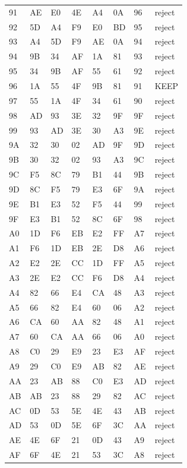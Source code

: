 \begin{longtable}{llllllll}
91 & AE & E0 & 4E & A4 & 0A & 96 & reject\\
92 & 5D & A4 & F9 & E0 & BD & 95 & reject\\
93 & A4 & 5D & F9 & AE & 0A & 94 & reject\\
94 & 9B & 34 & AF & 1A & 81 & 93 & reject\\
95 & 34 & 9B & AF & 55 & 61 & 92 & reject\\
96 & 1A & 55 & 4F & 9B & 81 & 91 & KEEP\\
97 & 55 & 1A & 4F & 34 & 61 & 90 & reject\\
98 & AD & 93 & 3E & 32 & 9F & 9F & reject\\
99 & 93 & AD & 3E & 30 & A3 & 9E & reject\\
9A & 32 & 30 & 02 & AD & 9F & 9D & reject\\
9B & 30 & 32 & 02 & 93 & A3 & 9C & reject\\
9C & F5 & 8C & 79 & B1 & 44 & 9B & reject\\
9D & 8C & F5 & 79 & E3 & 6F & 9A & reject\\
9E & B1 & E3 & 52 & F5 & 44 & 99 & reject\\
9F & E3 & B1 & 52 & 8C & 6F & 98 & reject\\
A0 & 1D & F6 & EB & E2 & FF & A7 & reject\\
A1 & F6 & 1D & EB & 2E & D8 & A6 & reject\\
A2 & E2 & 2E & CC & 1D & FF & A5 & reject\\
A3 & 2E & E2 & CC & F6 & D8 & A4 & reject\\
A4 & 82 & 66 & E4 & CA & 48 & A3 & reject\\
A5 & 66 & 82 & E4 & 60 & 06 & A2 & reject\\
A6 & CA & 60 & AA & 82 & 48 & A1 & reject\\
A7 & 60 & CA & AA & 66 & 06 & A0 & reject\\
A8 & C0 & 29 & E9 & 23 & E3 & AF & reject\\
A9 & 29 & C0 & E9 & AB & 82 & AE & reject\\
AA & 23 & AB & 88 & C0 & E3 & AD & reject\\
AB & AB & 23 & 88 & 29 & 82 & AC & reject\\
AC & 0D & 53 & 5E & 4E & 43 & AB & reject\\
AD & 53 & 0D & 5E & 6F & 3C & AA & reject\\
AE & 4E & 6F & 21 & 0D & 43 & A9 & reject\\
AF & 6F & 4E & 21 & 53 & 3C & A8 & reject\\

\end{longtable}

